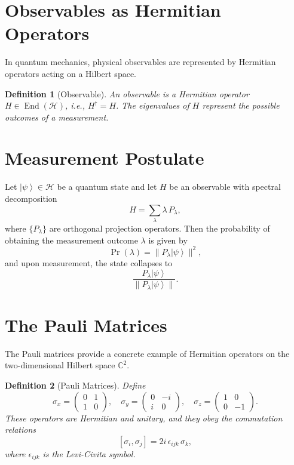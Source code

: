 \documentclass[11pt,oneside]{book}
\newtheorem{definition}{Definition}[chapter]
\theoremstyle{remark}
\renewcommand{\ket}[1]{\left| #1 \right\rangle}
\begin{document}
	\section{Observables as Hermitian Operators}
	In quantum mechanics, physical observables are represented by Hermitian operators acting on a Hilbert space.
	
	\begin{definition}[Observable]
		An \emph{observable} is a Hermitian operator $H\in\operatorname{End}(\mathcal{H})$, i.e., $H^\dagger = H$. The eigenvalues of $H$ represent the possible outcomes of a measurement.
	\end{definition}
	
	\section{Measurement Postulate}
	Let $\ket{\psi}\in\mathcal{H}$ be a quantum state and let $H$ be an observable with spectral decomposition
	\[
	H = \sum_{\lambda} \lambda\, P_\lambda,
	\]
	where $\{P_\lambda\}$ are orthogonal projection operators. Then the probability of obtaining the measurement outcome $\lambda$ is given by
	\[
	\Pr(\lambda) = \|P_\lambda \ket{\psi}\|^2,
	\]
	and upon measurement, the state collapses to
	\[
	\frac{P_\lambda \ket{\psi}}{\|P_\lambda \ket{\psi}\|}.
	\]
	
	\section{The Pauli Matrices}
	The Pauli matrices provide a concrete example of Hermitian operators on the two-dimensional Hilbert space $\mathbb{C}^2$.
	
	\begin{definition}[Pauli Matrices]
		Define
		\[
		\sigma_x = \begin{pmatrix} 0 & 1 \\ 1 & 0 \end{pmatrix}, \quad
		\sigma_y = \begin{pmatrix} 0 & -i \\ i & 0 \end{pmatrix}, \quad
		\sigma_z = \begin{pmatrix} 1 & 0 \\ 0 & -1 \end{pmatrix}.
		\]
		These operators are Hermitian and unitary, and they obey the commutation relations
		\[
		[\sigma_i,\sigma_j] = 2i\,\epsilon_{ijk}\,\sigma_k,
		\]
		where $\epsilon_{ijk}$ is the Levi-Civita symbol.
	\end{definition}
	
\end{document}
